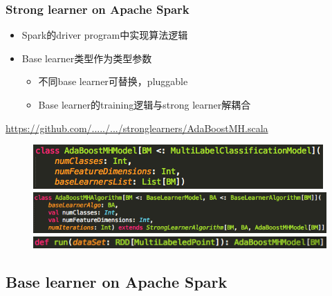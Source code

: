 \documentclass{beamer}
\begin{document}
\begin{frame}
\frametitle{Strong learner on Apache Spark}
\begin{itemize}
\item Spark的driver program中实现算法逻辑
\item Base learner类型作为类型参数
  \begin{itemize}
    \item 不同base learner可替换，pluggable
    \item Base learner的training逻辑与strong learner解耦合
  \end{itemize}
\end{itemize}
{ \footnotesize
\href{https://github.com/BaiGang/spark_multiboost/blob/master/src/main/scala/org/apache/spark/mllib/classification/multilabel/stronglearners/AdaBoostMH.scala}{https://github.com/...../.../stronglearners/AdaBoostMH.scala}
}
\begin{figure}
\includegraphics[scale=0.5,left]{img/adbm_model_spark.png} \\
\includegraphics[scale=0.5,left]{img/adbm_algo_spark.png} \\
\includegraphics[scale=0.5,left]{img/adbm_run.png}
\end{figure}

\end{frame}

\subsection{Base learner on Apache Spark}
\end{document}
